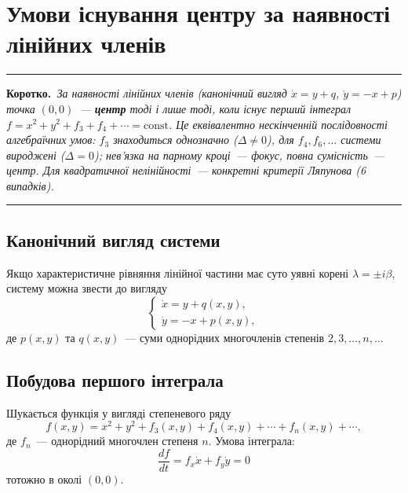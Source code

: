 \documentclass[12pt,a4paper]{article}
\theoremstyle{definition}
\theoremstyle{plain}
\newenvironment{korotko}
  {\par\medskip\noindent\begingroup\color{accent!75!black}\rule{\linewidth}{0.4pt}\par
   \noindent\textbf{Коротко.}\itshape\,}
  {\par\noindent\rule{\linewidth}{0.4pt}\endgroup\medskip}
\begin{document}
\newpage
\section{Умови існування центру за наявності лінійних членів}


\begin{korotko}
За наявності лінійних членів (канонічний вигляд $\dot x=y+q$, $\dot y=-x+p$)
точка $(0,0)$~--- \textbf{центр} тоді і лише тоді, коли існує перший інтеграл
$f=x^2+y^2+f_3+f_4+\cdots=\mathrm{const}$. Це еквівалентно нескінченній
послідовності алгебраїчних умов: $f_3$ знаходиться однозначно ($\Delta\neq0$),
для $f_4,f_6,\ldots$ системи вироджені ($\Delta=0$); нев'язка на парному
кроці~--- фокус, повна сумісність~--- центр. Для квадратичної нелінійності~---
конкретні критерії Ляпунова (6 випадків).
\end{korotko}

\subsection{Канонічний вигляд системи}

Якщо характеристичне рівняння лінійної частини має суто уявні корені
$\lambda=\pm i\beta$, систему можна звести до вигляду
\begin{equation}
  \begin{cases}
    \dot x = y + q(x,y),\\[2pt]
    \dot y = -x + p(x,y),
  \end{cases}
  \label{eq:canonical-center}
\end{equation}
де $p(x,y)$ та $q(x,y)$~--- суми однорідних многочленів степенів
$2,3,\ldots,n,\ldots$

\subsection{Побудова першого інтеграла}

Шукається функція у вигляді степеневого ряду
\begin{equation}
  f(x,y) = x^2 + y^2 + f_3(x,y) + f_4(x,y) + \cdots + f_n(x,y) + \cdots,
\end{equation}
де $f_n$~--- однорідний многочлен степеня $n$. Умова інтеграла:
\begin{equation}
  \frac{df}{dt}
  = f_x\dot x + f_y\dot y = 0
  \label{eq:df-dt-zero}
\end{equation}
тотожно в околі $(0,0)$.
\end{document}
